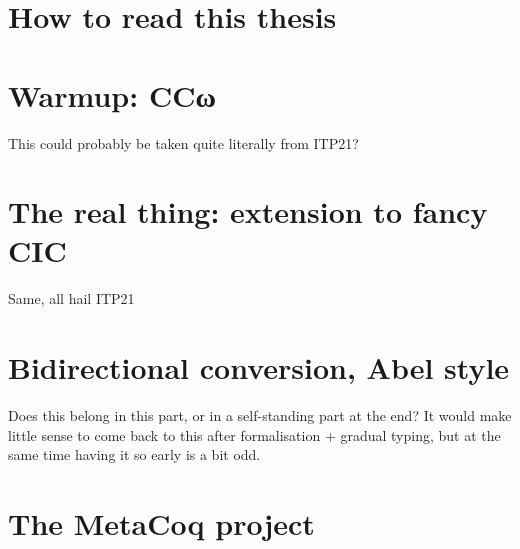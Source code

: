 \documentclass[
  french,english,
	fontsize=10pt, %
	twoside=true, %
	secnumdepth=1, %
]{kaobook/kaobook}
\begin{document}



\mainmatter %

\chapter*{How to read this thesis}









\label{part:bidirectional-typing}

\chapter{Warmup: CCω}

This could probably be taken quite literally from ITP21?

\chapter{The real thing: extension to fancy CIC}

Same, all hail ITP21

\chapter{Bidirectional conversion, Abel style}

Does this belong in this part, or in a self-standing part at the end?
It would make little sense to come back to this after formalisation + gradual typing,
but at the same time having it so early is a bit odd.

\label{part:metacoq}

\chapter{The MetaCoq project}
\end{document}
